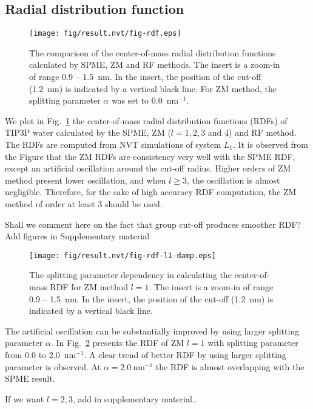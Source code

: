 \documentclass[aip,jcp,a4paper,preprint,unsortedaddress,onecolumn,fleqn]{revtex4-1}
\newcommand{\recheck}[1]{{\color{red} #1}}
\newcommand{\systemlb}{L_1}
\begin{document}
\subsection{Radial distribution function}

\begin{figure}
  \centering
  \texttt{[image: fig/result.nvt/fig-rdf.eps]}  
  \caption{The comparison of the center-of-mass radial distribution functions
    calculated by SPME, ZM and RF methods. The insert is a zoom-in of
    range 0.9 -- 1.5~nm. In the insert, the position of the cut-off
    (1.2~nm) is indicated by a vertical black line.
    For ZM method, the splitting parameter $\alpha$ was set to 0.0~$\textrm{nm}^{-1}$.
  }
  \label{fig:rdf}
\end{figure}

We plot in Fig.~\ref{fig:rdf} the center-of-mass radial distribution functions (RDFs) of TIP3P water
calculated by the SPME, ZM ($l=1,2,3$ and 4) and RF method.  The RDFs
are computed from NVT simulations of system $\systemlb$. It is
observed from the Figure that the ZM RDFs are consistency very well
with the SPME RDF, except an artificial oscillation around the
cut-off radius. Higher orders of ZM method present lower oscillation, and when
$l\geq 3$, the oscillation is almost negligible. Therefore, for the sake
of high accuracy RDF computation, the ZM method of order at least 3 should be used.

\recheck{Shall we comment here on the fact that group cut-off produces smoother RDF? Add figures in Supplementary material}

\begin{figure}
  \centering
  \texttt{[image: fig/result.nvt/fig-rdf-l1-damp.eps]}  
  \caption{
    The splitting parameter dependency in calculating the center-of-mass RDF for
    ZM method $l=1$. The insert is a zoom-in of
    range 0.9 -- 1.5~nm. In the insert, the position of the cut-off
    (1.2~nm) is indicated by a vertical black line.
  }
  \label{fig:rdf-damp}
\end{figure}

The artificial oscillation can be substantially improved by using larger splitting parameter $\alpha$.
In Fig.~\ref{fig:rdf-damp} presents the RDF of ZM $l=1$ with splitting parameter from 0.0 to 2.0~$\textrm{nm}^{-1}$.
A clear trend of better RDF by using larger splitting parameter is observed.
At $\alpha = 2.0\ \textrm{nm}^{-1}$ the RDF is almost overlapping with the SPME result.

\recheck{If we want $l=2,3$, add in supplementary material..}
\end{document}
